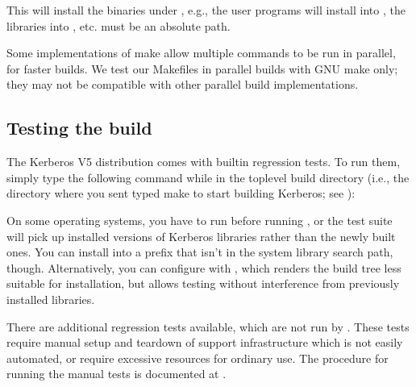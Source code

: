 \documentclass[letterpaper,10pt,english]{sphinxmanual}
\begin{document}
\begin{sphinxVerbatim}[commandchars=\\\{\}]
  
\end{sphinxVerbatim}

\sphinxAtStartPar
This will install the binaries under , e.g., the user
programs will install into , the libraries into
, etc.   must be an absolute path.

\sphinxAtStartPar
Some implementations of make allow multiple commands to be run in
parallel, for faster builds.  We test our Makefiles in parallel builds
with GNU make only; they may not be compatible with other parallel
build implementations.


\subsection{Testing the build}
\label{\detokenize{build/doing_build:testing-the-build}}
\sphinxAtStartPar
The Kerberos V5 distribution comes with built\sphinxhyphen{}in regression tests.  To
run them, simply type the following command while in the top\sphinxhyphen{}level
build directory (i.e., the directory where you sent typed make to
start building Kerberos; see {\hyperref[\detokenize{build/doing_build:do-build}]{}}):

\begin{sphinxVerbatim}[commandchars=\\\{\}]
 
\end{sphinxVerbatim}

\sphinxAtStartPar
On some operating systems, you have to run  before
running , or the test suite will pick up installed
versions of Kerberos libraries rather than the newly built ones.  You
can install into a prefix that isn’t in the system library search
path, though.  Alternatively, you can configure with
\sphinxstylestrong{\sphinxhyphen{}}, which renders the build tree less suitable
for installation, but allows testing without interference from
previously installed libraries.

\sphinxAtStartPar
There are additional regression tests available, which are not run
by .  These tests require manual setup and teardown of
support infrastructure which is not easily automated, or require
excessive resources for ordinary use.  The procedure for running
the manual tests is documented at
.
\end{document}
